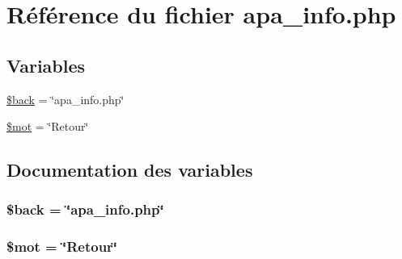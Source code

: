 \hypertarget{apa__info_8php}{
\section{R\'{e}f\'{e}rence du fichier apa\_\-info.php}
\label{apa__info_8php}
}
\subsection*{Variables}
\begin{CompactItemize}
\item 
\hyperlink{apa__info_8php_a0}{\$back} = \char`\"{}apa\_\-info.php\char`\"{}
\item 
\hyperlink{apa__info_8php_a1}{\$mot} = \char`\"{}Retour\char`\"{}
\end{CompactItemize}


\subsection{Documentation des variables}
\hypertarget{apa__info_8php_a0}{
\subsubsection[\$back]{\setlength{\rightskip}{0pt plus 5cm}\$back = \char`\"{}apa\_\-info.php\char`\"{}}}
\label{apa__info_8php_a0}


\hypertarget{apa__info_8php_a1}{
\subsubsection[\$mot]{\setlength{\rightskip}{0pt plus 5cm}\$mot = \char`\"{}Retour\char`\"{}}}
\label{apa__info_8php_a1}


